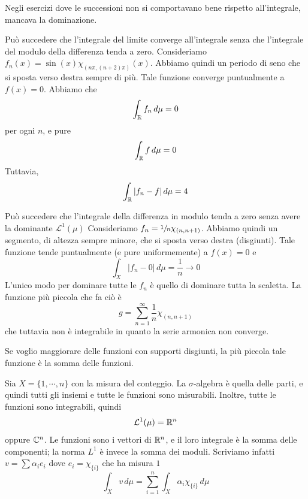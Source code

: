 \documentclass[a4paper]{article}
\begin{document}
\begin{radioactive}
Negli esercizi dove le successioni non si comportavano bene rispetto all'integrale,
mancava la dominazione.
\end{radioactive}

\begin{radioactive}
\begin{snippetexample}{Può succedere che l'integrale del limite converge all'integrale senza che
    l'integrale del modulo della differenza tenda a zero.}
    Consideriamo \(f_n(x)=\sin(x)\chi_{(n\pi,(n+2)\pi)}(x)\).
    Abbiamo quindi un periodo di seno che si sposta verso destra sempre di più.
    Tale funzione converge puntualmente a \(f(x) = 0\).
    Abbiamo che
    \[
        \int_{\mathbb{R}} f_n\,d\mu = 0
    \]
    per ogni \(n\), e pure \[
        \int_{\mathbb{R}} f\,d\mu = 0
    \]
    Tuttavia,
    \[
        \int_{\mathbb{R}} |f_n-f|\,d\mu = 4
    \]
\end{snippetexample}
\end{radioactive}

\begin{radioactive}
\begin{snippetexample}{Può succedere che l'integrale della differenza in modulo tenda a zero senza avere la dominante \(\mathcal L^1(\mu)\)}
    Consideriamo \(f_n = \sfrac{1}{n} \chi_{(n,n+1)}\).
    Abbiamo quindi un segmento, di altezza sempre minore, che si sposta verso destra (disgiunti).
    Tale funzione tende puntualmente (e pure uniformemente) a \(f(x) = 0\) e \[
        \int_X |f_n - 0|\,d\mu = \frac1n \to 0
    \]
    L'unico modo per dominare tutte le \(f_n\) è quello di dominare tutta la scaletta.
    La funzione più piccola che fa ciò è \[
        g = \sum_{n=1}^\infty \frac1n \chi_{(n,n+1)}
    \]
    che tuttavia non è integrabile in quanto la serie armonica non converge.
\end{snippetexample}
\end{radioactive}

\begin{radioactive}
Se voglio maggiorare delle funzioni con supporti disgiunti, la più piccola tale funzione
è la somma delle funzioni.
\end{radioactive}

\begin{radioactive}
\begin{snippetexample}{}
    Sia \(X = \{1, \cdots, n\}\)
    con la misura del conteggio. La \(\sigma\)-algebra è quella delle parti,
    e quindi tutti gli insiemi e tutte le funzioni sono misurabili.
    Inoltre, tutte le funzioni sono integrabili,
    quindi
    \[
        \mathcal L^1(\mu) = \mathbb{R}^n
    \]
    oppure \(\mathbb{C}^n\).
    Le funzioni sono i vettori di \(\mathbb{R}^n\),
    e il loro integrale è la somma delle componenti; la norma \(L^1\) è invece la somma dei moduli.
    Scriviamo infatti \(v = \sum \alpha_i e_i\)
    dove \(e_i = \chi_{\{i\}}\) che ha misura \(1\)
    \[
        \int_X v\,d\mu = \sum_{i=1}^n \int_X \alpha_i \chi_{\{i\}}\,d\mu
    \]
\end{snippetexample}
\end{radioactive}
\end{document}
